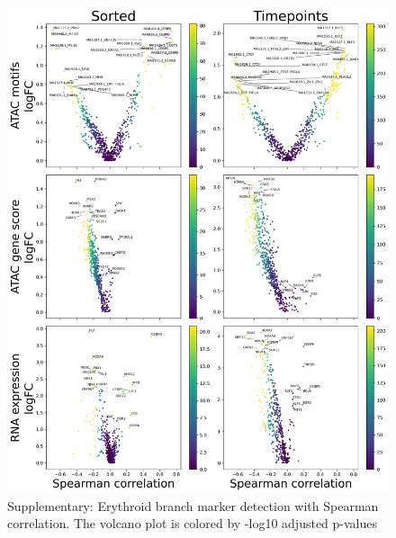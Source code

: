 \documentclass[a4paper]{article}
\begin{document}
\begin{figure}[!htb]
  \centering
  \includegraphics[width=\textwidth]{../figures/hematopoiesis/Neutrophil_40_106_smooth_none_single_branch_volcanos_motifs.png}
  \caption{Supplementary: Erythroid branch marker detection with Spearman correlation. The volcano plot is colored by -log10 adjusted p-values}
\end{figure}
\end{document}
